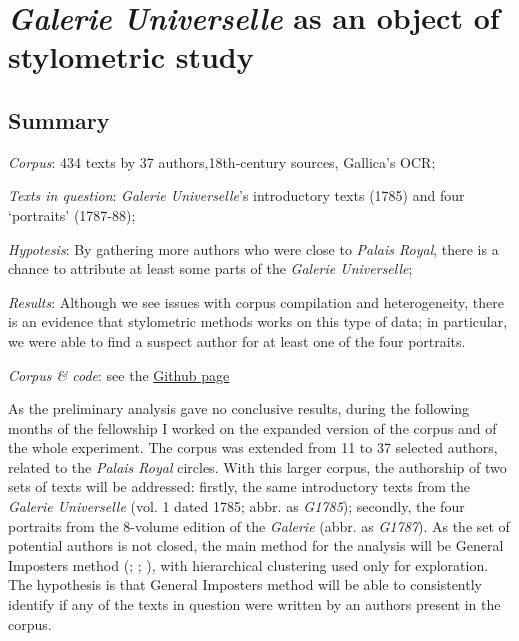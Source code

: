 \documentclass[12pt, letterpaper]{article}
\begin{document}
\section{\emph{Galerie Universelle} as an object of stylometric study}
\subsection{Summary}
\emph{Corpus}: 434 texts by 37 authors,18th-century sources, Gallica's OCR;

\emph{Texts in question}: \emph{Galerie Universelle}'s introductory texts (1785) and four `portraits' (1787-88);

\emph{Hypotesis}: By gathering more authors who were close to \emph{Palais Royal}, there is a chance to attribute at least some parts of the \emph{Galerie Universelle};

\emph{Results}: Although we see issues with corpus compilation and heterogeneity, there is an evidence that stylometric methods works on this type of data; in particular, we were able to find a suspect author for at least one of the four portraits.

\emph{Corpus \& code}: see the \href{https://github.com/tonyamart/fr_pamphlets/tree/main/experiment_galerie_2}{Github page}

As the preliminary analysis gave no conclusive results, during the following months of the fellowship I worked on the expanded version of the corpus and of the whole experiment. The corpus was extended from 11 to 37 selected authors, related to the \emph{Palais Royal} circles. With this larger corpus, the authorship of two sets of texts will be addressed: firstly, the same introductory texts from the \emph{Galerie Universelle} (vol. 1 dated 1785; abbr. as \emph{G1785}); secondly, the four portraits from the 8-volume edition of the \emph{Galerie} (abbr. as \emph{G1787}). As the set of potential authors is not closed, the main method for the analysis will be General Imposters method (\cite{koppel_determining_2014}; \cite{kestemont_authenticating_2016}; \cite{eder_authorship_2018}), with hierarchical clustering used only for exploration. The hypothesis is that General Imposters method will be able to consistently identify if any of the texts in question were written by an authors present in the corpus.
\end{document}
